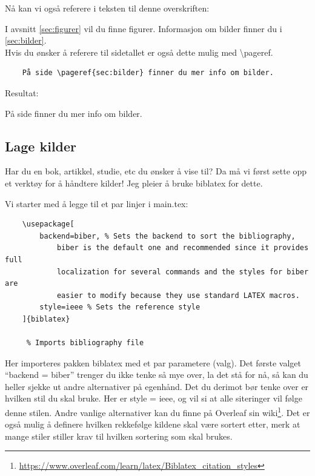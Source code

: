         Nå kan vi også referere i teksten til denne overskriften:
        
        I avsnitt \ref{sec:figurer} vil du finne figurer. Informasjon om bilder finner du i \ref{sec:bilder}.\\
        
        Hvis du ønsker å referere til sidetallet er også dette mulig med \textbackslash pageref.
        \begin{verbatim}
    På side \pageref{sec:bilder} finner du mer info om bilder.
        \end{verbatim}
        Resultat:
        
        På side \pageref{sec:bilder} finner du mer info om bilder.
            
    \subsection{Lage kilder}
        Har du en bok, artikkel, studie, etc du ønsker å vise til? Da må vi først sette opp et verktøy for å håndtere kilder! Jeg pleier å bruke biblatex for dette.
        
        Vi starter med å legge til et par linjer i main.tex:
        \begin{verbatim}
    \usepackage[
        backend=biber, % Sets the backend to sort the bibliography, 
            biber is the default one and recommended since it provides full 
            localization for several commands and the styles for biber are 
            easier to modify because they use standard LATEX macros.
        style=ieee % Sets the reference style
    ]{biblatex}
    
     % Imports bibliography file        
        \end{verbatim}
        
        Her importeres pakken biblatex med et par parametere (valg). Det første valget ``backend = biber'' trenger du ikke tenke så mye over, la det stå for nå, så kan du heller sjekke ut andre alternativer på egenhånd. Det du derimot bør tenke over er hvilken stil du skal bruke. Her er style = ieee, og vil si at alle siteringer vil følge denne stilen. Andre vanlige alternativer kan du finne på Overleaf sin wiki\footnote{\protect\url{https://www.overleaf.com/learn/latex/Biblatex_citation_styles}}.
        Det er også mulig å definere hvilken rekkefølge kildene skal være sortert etter, merk at mange stiler stiller krav til hvilken sortering som skal brukes.
        
